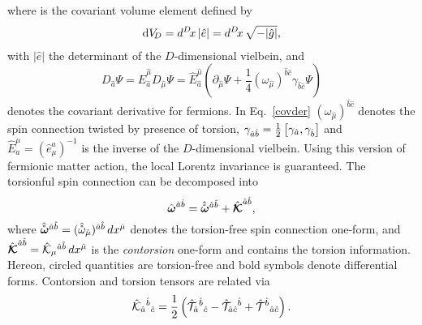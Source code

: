 where \dv[D] %
is the covariant volume element defined by
\begin{align}
  \dv[D]=d^D\! x\,|\hat{e}|= d^D\! x\,\sqrt{-|\hat{g}|},
\end{align}
with $|\hat{e}|$ %
the determinant of the $D$-dimensional vielbein, and
\begin{equation}
  \label{covder}
  D_{\hat{a}}\Psi = \hat{E}_{\hat{a}}^{\hat{\mu}}D_{\hat{\mu}}\Psi = \hat{E}_{\hat{a}}^{\hat{\mu}}\left(\partial_{\hat{\mu}}\Psi + \frac{1}{4}(\omega_{\hat{\mu}})^{\hat{b}\hat{c}}\gamma_{\hat{b}\hat{c}}\Psi\right)
\end{equation}
denotes the covariant derivative for fermions.
In Eq.~\eqref{covder} $(\omega_{\hat{\mu}})^{\hat{b}\hat{c}}$ denotes the spin connection twisted by presence of torsion, $\gamma_{\hat{a}\hat{b}} = \frac{1}{2}\comm{\gamma_{\hat{a}}}{\gamma_{\hat{b}}}$ and $\hat{E}^\mu_a = \left(\hat{e}^a_\mu\right)^{-1}$ is the inverse of the $D$-dimensional vielbein. Using this version of fermionic matter action, the local Lorentz invariance is guaranteed. The torsionful spin connection can be decomposed into
\begin{equation}
  \label{spinconndecomp}
  \wfh^{\hat{a}\hat{b}} = \wfhfree^{\hat{a}\hat{b}} + \hat{\Kf}^{\hat{a}\hat{b}},
\end{equation}
where $\wfhfree^{\hat{a}\hat{b}} = (\hat{\mathring{\omega}}_{\hat{\mu}})^{\hat{a}\hat{b}}\,dx^{\hat{\mu}}$ denotes the torsion-free spin connection one-form, and $\hat{\Kf}^{\hat{a}\hat{b}} = \hat{\K}_{\mu}{}^{\hat{a}\hat{b}}\,dx^{\hat{\mu}}$ is the \textit{contorsion} one-form and contains the torsion information. Hereon, circled quantities are torsion-free and bold symbols denote differential forms.  Contorsion and torsion tensors are related via
\begin{equation}
  \label{generalcontorsion}
  \hat{\K}_{\hat{a}}{}^{\hat{b}}{}_{\hat{c}} = \frac{1}{2}\left(\hat{\T}_{\hat{a}}{}^{\hat{b}}{}_{\hat{c}} - \hat{\T}_{\hat{a}\hat{c}}{}^{\hat{b}} + \hat{\T}^{\hat{b}}{}_{\hat{a}\hat{c}}\right).
\end{equation}

